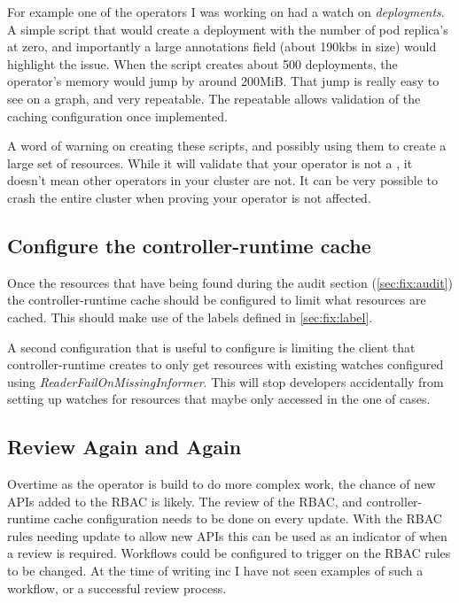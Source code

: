 For example one of the operators I was working on had a watch on \textit{deployments}\cite{noauthor_deployments_nodate}.
A simple script\cite{noauthor_kuadrant-crc-setupcreate-deploymentsfish_nodate}  that would create a deployment with the number of pod replica's at zero, and importantly a large annotations field (about 190kbs in size) would highlight the issue.
When the script creates about 500 deployments, the operator's memory would jump by around 200MiB.
That jump is really easy to see on a graph, and very repeatable.
The repeatable allows validation of the caching configuration once implemented.

A word of warning on creating these scripts, and possibly using them to create a large set of resources.
While it will validate that your operator is not a \nn{}, it doesn't mean other operators in your cluster are not.
It can be very possible to crash the entire cluster when proving your operator is not affected.

\subsection{Configure the controller-runtime cache}
Once the resources that have being found during the audit section (\cref{sec:fix:audit}) the controller-runtime cache should be configured to limit what resources are cached.
This should make use of the labels defined in \cref{sec:fix:label}.

A second configuration that is useful to configure is limiting the client that controller-runtime creates to only get resources with existing watches configured using \textit{ReaderFailOnMissingInformer}\cite{noauthor_cache_nodate}.
This will stop developers accidentally from setting up watches for resources that maybe only accessed in the one of cases.

\subsection{Review Again and Again}
Overtime as the operator is build to do more complex work, the chance of new APIs added to the RBAC is likely.
The review of the RBAC, and controller-runtime cache configuration needs to be done on every update.
With the RBAC rules needing update to allow new APIs this can be used as an indicator of when a review is required.
Workflows could be configured to trigger on the RBAC rules to be changed.
At the time of writing inc I have not seen examples of such a workflow, or a successful review process.

